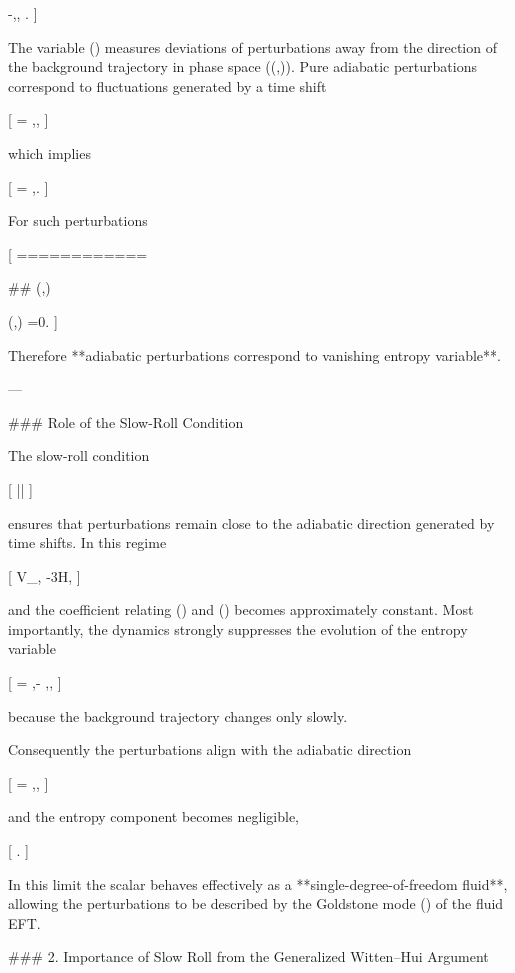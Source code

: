 -,,
\delta\sigma .
]

The variable (\delta\sigma) measures deviations of perturbations away from the direction of the background trajectory in phase space ((\phi,\dot\phi)). Pure adiabatic perturbations correspond to fluctuations generated by a time shift

[
\delta\phi = \dot\phi,\pi,
]

which implies

[
\delta\dot\phi = \ddot\phi,\pi .
]

For such perturbations

[
\delta\sigma
============

## \dot\phi(\ddot\phi,\pi)

\ddot\phi(\dot\phi,\pi)
=0.
]

Therefore **adiabatic perturbations correspond to vanishing entropy variable**.

---

### Role of the Slow-Roll Condition

The slow-roll condition

[
\left|\right| 
]

ensures that perturbations remain close to the adiabatic direction generated by time shifts. In this regime

[
V_{,\phi} \simeq -3H\dot\phi,
]

and the coefficient relating (\Gamma) and (\delta\sigma) becomes approximately constant. Most importantly, the dynamics strongly suppresses the evolution of the entropy variable

[
\delta\sigma = \dot\phi,\delta\dot\phi - \ddot\phi,\delta\phi ,
]

because the background trajectory changes only slowly.

Consequently the perturbations align with the adiabatic direction

[
\delta\phi = \dot\phi,\pi,
]

and the entropy component becomes negligible,

[
\Gamma {} .
]

In this limit the scalar behaves effectively as a **single-degree-of-freedom fluid**, allowing the perturbations to be described by the Goldstone mode (\pi) of the fluid EFT.




### 2. Importance of Slow Roll from the Generalized Witten–Hui Argument

